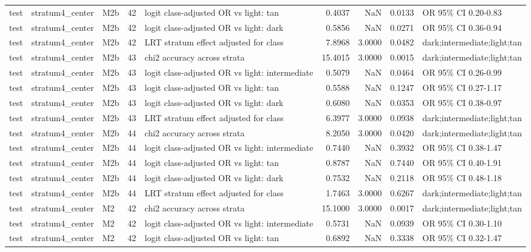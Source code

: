 \begin{tabular}{lllrlrrrl}
test & stratum4\_center & M2b & 42 & logit class-adjusted OR vs light: tan & 0.4037 & NaN & 0.0133 & OR 95\% CI 0.20-0.83 \\
test & stratum4\_center & M2b & 42 & logit class-adjusted OR vs light: dark & 0.5856 & NaN & 0.0271 & OR 95\% CI 0.36-0.94 \\
test & stratum4\_center & M2b & 42 & LRT stratum effect adjusted for class & 7.8968 & 3.0000 & 0.0482 & dark;intermediate;light;tan \\
test & stratum4\_center & M2b & 43 & chi2 accuracy across strata & 15.4015 & 3.0000 & 0.0015 & dark;intermediate;light;tan \\
test & stratum4\_center & M2b & 43 & logit class-adjusted OR vs light: intermediate & 0.5079 & NaN & 0.0464 & OR 95\% CI 0.26-0.99 \\
test & stratum4\_center & M2b & 43 & logit class-adjusted OR vs light: tan & 0.5588 & NaN & 0.1247 & OR 95\% CI 0.27-1.17 \\
test & stratum4\_center & M2b & 43 & logit class-adjusted OR vs light: dark & 0.6080 & NaN & 0.0353 & OR 95\% CI 0.38-0.97 \\
test & stratum4\_center & M2b & 43 & LRT stratum effect adjusted for class & 6.3977 & 3.0000 & 0.0938 & dark;intermediate;light;tan \\
test & stratum4\_center & M2b & 44 & chi2 accuracy across strata & 8.2050 & 3.0000 & 0.0420 & dark;intermediate;light;tan \\
test & stratum4\_center & M2b & 44 & logit class-adjusted OR vs light: intermediate & 0.7440 & NaN & 0.3932 & OR 95\% CI 0.38-1.47 \\
test & stratum4\_center & M2b & 44 & logit class-adjusted OR vs light: tan & 0.8787 & NaN & 0.7440 & OR 95\% CI 0.40-1.91 \\
test & stratum4\_center & M2b & 44 & logit class-adjusted OR vs light: dark & 0.7532 & NaN & 0.2118 & OR 95\% CI 0.48-1.18 \\
test & stratum4\_center & M2b & 44 & LRT stratum effect adjusted for class & 1.7463 & 3.0000 & 0.6267 & dark;intermediate;light;tan \\
test & stratum4\_center & M2 & 42 & chi2 accuracy across strata & 15.1000 & 3.0000 & 0.0017 & dark;intermediate;light;tan \\
test & stratum4\_center & M2 & 42 & logit class-adjusted OR vs light: intermediate & 0.5731 & NaN & 0.0939 & OR 95\% CI 0.30-1.10 \\
test & stratum4\_center & M2 & 42 & logit class-adjusted OR vs light: tan & 0.6892 & NaN & 0.3338 & OR 95\% CI 0.32-1.47 \\

\end{tabular}
